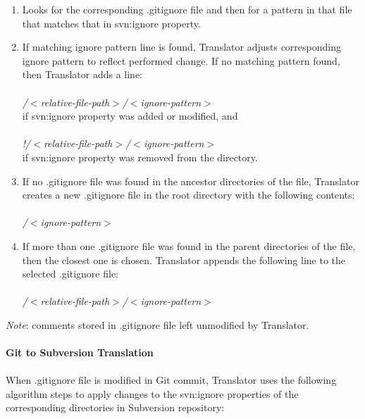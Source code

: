 \begin{enumerate}
\compactlist
\item Looks for the corresponding .gitignore file and then for a pattern in that file that matches that in svn:ignore property.\\
\item If matching ignore pattern line is found, Translator adjusts corresponding ignore pattern to reflect performed change.
If no matching pattern found, then Translator adds a line:\\\\
\emph{/$<$relative-file-path$>$/$<$ignore-pattern$>$}\\
if svn:ignore property was added or modified, and \\\\
\emph{!/$<$relative-file-path$>$/$<$ignore-pattern$>$}\\
if svn:ignore property was removed from the directory.\\
\item If no .gitignore file was found in the ancestor directories of the file, Translator creates a new .gitignore file in the root directory with the following contents:\\\\
\emph{/$<$ignore-pattern$>$}\\
\item 
If more than one .gitignore file was found in the parent directories of the file, then the closest one is chosen. 
Translator appends the following line to the selected .gitignore file:\\\\
\emph{/$<$relative-file-path$>$/$<$ignore-pattern$>$}\\
\end{enumerate}
\emph{Note}: comments stored in .gitignore file left unmodified by Translator.\\
\\
\textbf{Git to Subversion Translation}
\\\\
When .gitignore file is modified in Git commit, Translator uses the following algorithm steps to apply changes to the svn:ignore properties of the corresponding directories in Subversion repository:


